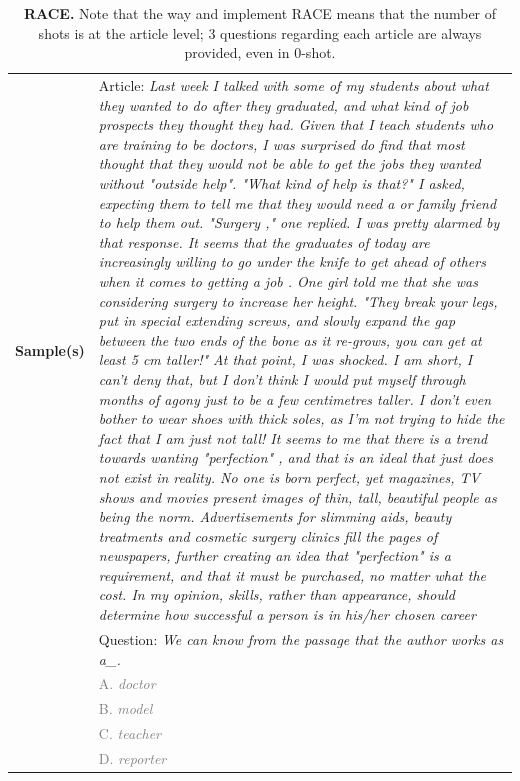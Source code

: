 \documentclass{article}
\begin{document}
\begin{table}[h]
\caption{\textbf{RACE.} Note that the way \citet{brown2020gpt3} and \citet{eval-harness} implement RACE means that the number of shots is at the article level; 3 questions regarding each article are always provided, even in 0-shot.}
\begin{tabular}{lp{11.5cm}}
\toprule
\textbf{Sample(s)} & Article: \emph{Last week I talked with some of my students about what they wanted to do after they graduated, and what kind of job prospects they thought they had. Given that I teach students who are training to be doctors, I was surprised do find that most thought that they would not be able to get the jobs they wanted without "outside help". "What kind of help is that?" I asked, expecting them to tell me that they would need a or family friend to help them out. "Surgery ," one replied. I was pretty alarmed by that response. It seems that the graduates of today are increasingly willing to go under the knife to get ahead of others when it comes to getting a job . One girl told me that she was considering surgery to increase her height. "They break your legs, put in special extending screws, and slowly expand the gap between the two ends of the bone as it re-grows, you can get at least 5 cm taller!" At that point, I was shocked. I am short, I can't deny that, but I don't think I would put myself through months of agony just to be a few centimetres taller. I don't even bother to wear shoes with thick soles, as I'm not trying to hide the fact that I am just not tall! It seems to me that there is a trend towards wanting "perfection" , and that is an ideal that just does not exist in reality. No one is born perfect, yet magazines, TV shows and movies present images of thin, tall, beautiful people as being the norm. Advertisements for slimming aids, beauty treatments and cosmetic surgery clinics fill the pages of newspapers, further creating an idea that "perfection" is a requirement, and that it must be purchased, no matter what the cost. In my opinion, skills, rather than appearance, should determine how successful a person is in his/her chosen career} \\
& Question: \emph{We can know from the passage that the author works as a\_.} \\
& \textcolor{gray}{A. \emph{doctor}} \\
& \textcolor{gray}{B. \emph{model}} \\
& \textcolor{gray}{C. \emph{teacher}} \\
& \textcolor{gray}{D. \emph{reporter}} \\

\end{tabular}
\end{table}
\end{document}
